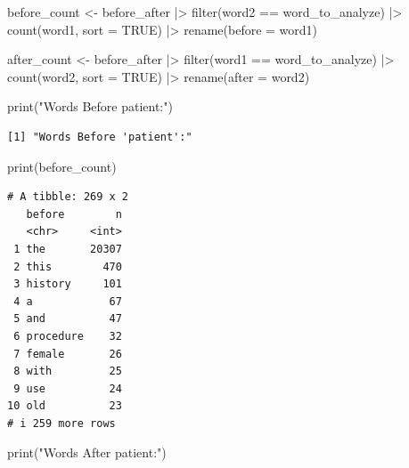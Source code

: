 \documentclass[
  letterpaper,
  DIV=11,
  numbers=noendperiod]{scrartcl}
\newenvironment{Shaded}{\begin{snugshade}}{\end{snugshade}}
\newcommand{\AttributeTok}[1]{\textcolor[rgb]{0.40,0.45,0.13}{#1}}
\newcommand{\ConstantTok}[1]{\textcolor[rgb]{0.56,0.35,0.01}{#1}}
\newcommand{\FunctionTok}[1]{\textcolor[rgb]{0.28,0.35,0.67}{#1}}
\newcommand{\NormalTok}[1]{\textcolor[rgb]{0.00,0.23,0.31}{#1}}
\newcommand{\OtherTok}[1]{\textcolor[rgb]{0.00,0.23,0.31}{#1}}
\newcommand{\SpecialCharTok}[1]{\textcolor[rgb]{0.37,0.37,0.37}{#1}}
\newcommand{\StringTok}[1]{\textcolor[rgb]{0.13,0.47,0.30}{#1}}
\begin{document}
\begin{Shaded}
\begin{Highlighting}[]
\NormalTok{before\_count }\OtherTok{\textless{}{-}}\NormalTok{ before\_after }\SpecialCharTok{|\textgreater{}}
\FunctionTok{filter}\NormalTok{(word2 }\SpecialCharTok{==}\NormalTok{ word\_to\_analyze) }\SpecialCharTok{|\textgreater{}}
\FunctionTok{count}\NormalTok{(word1, }\AttributeTok{sort =} \ConstantTok{TRUE}\NormalTok{) }\SpecialCharTok{|\textgreater{}}
\FunctionTok{rename}\NormalTok{(}\AttributeTok{before =}\NormalTok{ word1)}

\NormalTok{after\_count }\OtherTok{\textless{}{-}}\NormalTok{ before\_after }\SpecialCharTok{|\textgreater{}}
\FunctionTok{filter}\NormalTok{(word1 }\SpecialCharTok{==}\NormalTok{ word\_to\_analyze) }\SpecialCharTok{|\textgreater{}}
\FunctionTok{count}\NormalTok{(word2, }\AttributeTok{sort =} \ConstantTok{TRUE}\NormalTok{) }\SpecialCharTok{|\textgreater{}}
\FunctionTok{rename}\NormalTok{(}\AttributeTok{after =}\NormalTok{ word2)}
\end{Highlighting}
\end{Shaded}

\begin{Shaded}
\begin{Highlighting}[]
\FunctionTok{print}\NormalTok{(}\StringTok{"Words Before \textquotesingle{}patient\textquotesingle{}:"}\NormalTok{)}
\end{Highlighting}
\end{Shaded}

\begin{verbatim}
[1] "Words Before 'patient':"
\end{verbatim}

\begin{Shaded}
\begin{Highlighting}[]
\FunctionTok{print}\NormalTok{(before\_count)}
\end{Highlighting}
\end{Shaded}

\begin{verbatim}
# A tibble: 269 x 2
   before        n
   <chr>     <int>
 1 the       20307
 2 this        470
 3 history     101
 4 a            67
 5 and          47
 6 procedure    32
 7 female       26
 8 with         25
 9 use          24
10 old          23
# i 259 more rows
\end{verbatim}

\begin{Shaded}
\begin{Highlighting}[]
\FunctionTok{print}\NormalTok{(}\StringTok{"Words After \textquotesingle{}patient\textquotesingle{}:"}\NormalTok{)}
\end{Highlighting}
\end{Shaded}
\end{document}
